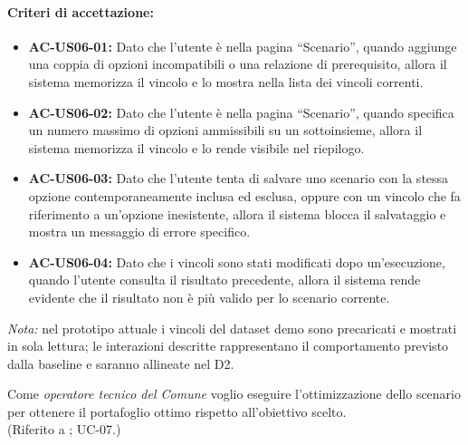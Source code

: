 \paragraph{Criteri di accettazione:}
\begin{itemize}[leftmargin=1.4em]
    \item \textbf{AC-US06-01:} Dato che l'utente è nella pagina ``Scenario'', quando aggiunge una coppia di opzioni incompatibili o una relazione di prerequisito, allora il sistema memorizza il vincolo e lo mostra nella lista dei vincoli correnti.
    \item \textbf{AC-US06-02:} Dato che l'utente è nella pagina ``Scenario'', quando specifica un numero massimo di opzioni ammissibili su un sottoinsieme, allora il sistema memorizza il vincolo e lo rende visibile nel riepilogo.
    \item \textbf{AC-US06-03:} Dato che l'utente tenta di salvare uno scenario con la stessa opzione contemporaneamente inclusa ed esclusa, oppure con un vincolo che fa riferimento a un'opzione inesistente, allora il sistema blocca il salvataggio e mostra un messaggio di errore specifico.
    \item \textbf{AC-US06-04:} Dato che i vincoli sono stati modificati dopo un'esecuzione, quando l'utente consulta il risultato precedente, allora il sistema rende evidente che il risultato non è più valido per lo scenario corrente.
\end{itemize}

\noindent\textit{Nota:} nel prototipo attuale i vincoli del dataset demo sono precaricati e mostrati in sola lettura; le interazioni descritte rappresentano il comportamento previsto dalla baseline e saranno allineate nel D2.

 \label{us:ottimizza}
Come \textit{operatore tecnico del Comune} voglio eseguire l'ottimizzazione dello scenario per ottenere il portafoglio ottimo rispetto all'obiettivo scelto. \\ (Riferito a ; UC-07.)

